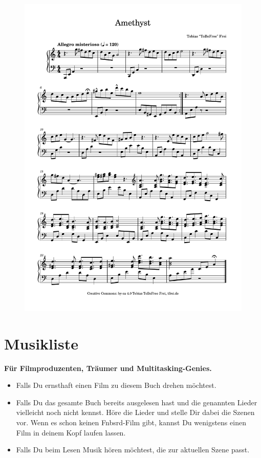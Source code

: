 \begin{figure}[p]
    \includegraphics[width=\textwidth, page=1]{z-include-amethyst.pdf}
\end{figure}


\chapter{Musikliste}

\textbf{Für Filmproduzenten, Träumer und Multitasking-Genies.}

\begin{itemize}
    \item Falls Du ernsthaft einen Film zu diesem Buch drehen möchtest.
    \item Falls Du das gesamte Buch bereits ausgelesen hast und die genannten Lieder vielleicht noch nicht kennst. Höre die Lieder und stelle Dir dabei die Szenen vor. Wenn es schon keinen Fnbsrd-Film gibt, kannst Du wenigstens einen Film in deinem Kopf laufen lassen.
    \item Falls Du beim Lesen Musik hören möchtest, die zur aktuellen Szene passt.
\end{itemize}


